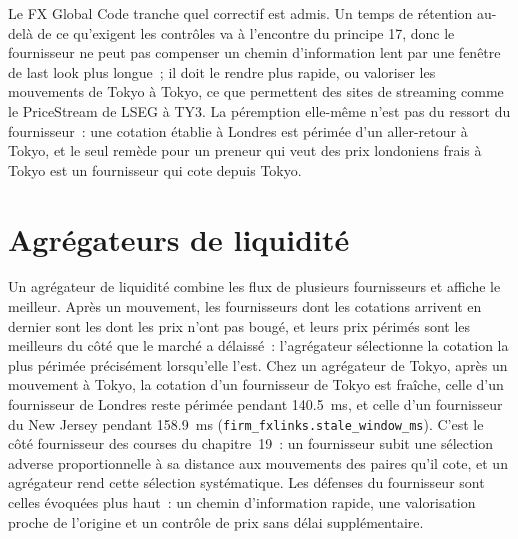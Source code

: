 Le FX Global Code tranche quel correctif est admis. Un temps de rétention au-delà de ce qu'exigent les contrôles va à l'encontre du principe 17, donc le fournisseur ne peut pas compenser
un chemin d'information lent par une fenêtre de last look plus longue~; il doit le rendre plus rapide, ou valoriser les mouvements de Tokyo à Tokyo, ce que
permettent des sites de streaming comme le PriceStream de LSEG à TY3. La péremption elle-même n'est pas du ressort du fournisseur~: une cotation établie
à Londres est périmée d'un aller-retour à Tokyo, et le seul remède pour un preneur qui veut des prix londoniens frais à Tokyo est un fournisseur qui cote
depuis Tokyo.

\section{Agrégateurs de liquidité}

Un agrégateur de liquidité combine les flux de plusieurs fournisseurs et affiche le meilleur. Après un mouvement, les fournisseurs dont les cotations arrivent en dernier sont les
dont les prix n'ont pas bougé, et leurs prix périmés sont les meilleurs du côté que le marché a délaissé~: l'agrégateur sélectionne
la cotation la plus périmée précisément lorsqu'elle l'est. Chez un agrégateur de Tokyo, après un mouvement à Tokyo, la cotation d'un fournisseur de Tokyo est fraîche, celle d'un fournisseur de Londres
reste périmée pendant \qty{140.5}{\milli\second}, et celle d'un fournisseur du New Jersey pendant \qty{158.9}{\milli\second}
(\texttt{firm\_fxlinks.stale\_window\_ms}). C'est le côté fournisseur des courses du chapitre~19~: un fournisseur
subit une sélection adverse proportionnelle à sa distance aux mouvements des paires qu'il cote, et un agrégateur rend cette
sélection systématique. Les défenses du fournisseur sont celles évoquées plus haut~: un chemin d'information rapide, une valorisation proche de l'origine et un contrôle de prix sans délai
supplémentaire.

